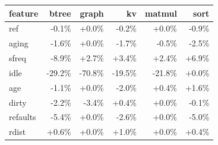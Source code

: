 \begin{tabular}{lrrrrr}
\toprule
feature & btree & graph & kv & matmul & sort \\
\midrule
ref & -0.1\% & {+}0.0\% & -0.2\% & {+}0.0\% & -0.9\% \\
aging & -1.6\% & {+}0.0\% & -1.7\% & -0.5\% & -2.5\% \\
sfreq & -8.9\% & {+}2.7\% & {+}3.4\% & {+}2.4\% & {+}6.9\% \\
idle & -29.2\% & -70.8\% & -19.5\% & -21.8\% & {+}0.0\% \\
age & -1.1\% & {+}0.0\% & -2.0\% & {+}0.4\% & {+}1.6\% \\
dirty & -2.2\% & -3.4\% & {+}0.4\% & {+}0.0\% & -0.1\% \\
refaults & -5.4\% & {+}0.0\% & -2.6\% & {+}0.0\% & -5.0\% \\
rdist & {+}0.6\% & {+}0.0\% & {+}1.0\% & {+}0.0\% & {+}0.4\% \\
\bottomrule
\end{tabular}
